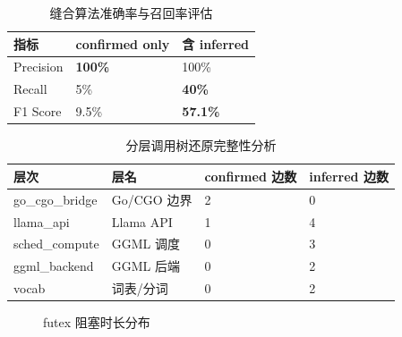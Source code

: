 \documentclass[12pt,a4paper]{ctexbook}
\begin{document}
\begin{table}[htbp]
\centering
\caption{缝合算法准确率与召回率评估}
\label{tab:stitching_accuracy}
\begin{tabular}{|p{5cm}|p{4cm}|p{4cm}|}
\hline
\textbf{指标} & \textbf{confirmed only} & \textbf{含 inferred} \\
\hline
Precision & \textbf{100\%} & 100\% \\
\hline
Recall & 5\% & \textbf{40\%} \\
\hline
F1 Score & 9.5\% & \textbf{57.1\%} \\
\hline
\end{tabular}
\end{table}
\newpage

\begin{table}[htbp]
\centering
\caption{分层调用树还原完整性分析}
\label{tab:layer_completeness}
\begin{tabular}{|p{3cm}|p{3.5cm}|p{3cm}|p{4cm}|}
\hline
\textbf{层次} & \textbf{层名} & \textbf{confirmed 边数} & \textbf{inferred 边数} \\
\hline
go\_cgo\_bridge & Go/CGO 边界 & 2 & 0 \\
\hline
llama\_api & Llama API & 1 & 4 \\
\hline
sched\_compute & GGML 调度 & 0 & 3 \\
\hline
ggml\_backend & GGML 后端 & 0 & 2 \\
\hline
vocab & 词表/分词 & 0 & 2 \\
\hline
\end{tabular}
\end{table}
\newpage

\begin{figure}[htbp]
\centering
{}
\caption{futex 阻塞时长分布}
\label{fig:futex_distribution}
\end{figure}
\newpage
\end{document}
